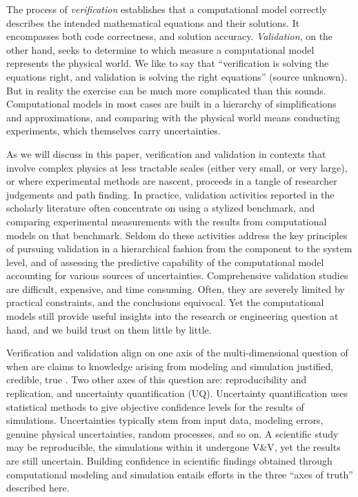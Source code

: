 The process of \emph{verification} establishes that a computational model correctly describes the intended mathematical equations and their solutions.
It encompasses both code correctness, and solution accuracy.
\emph{Validation}, on the other hand, seeks to determine to which measure a computational model represents the physical world. 
We like to say that ``verification is solving the equations right, and validation is solving the right equations'' (source unknown). 
But in reality the exercise can be much more complicated than this sounds. 
Computational models in most cases are built in a hierarchy of simplifications and approximations, and comparing with the physical world means conducting experiments, which themselves carry uncertainties. 

As we will discuss in this paper, verification and validation in contexts that involve complex physics at less tractable scales (either very small, or very large), or where experimental methods are nascent, proceeds in a tangle of researcher judgements and path finding. 
In practice, validation activities reported in the scholarly literature often concentrate on using a stylized benchmark, and comparing experimental measurements with the results from computational models on that benchmark. 
Seldom do these activities address the key principles of pursuing validation in a hierarchical fashion from the component to the system level, and of assessing the predictive capability of the computational model accounting for various sources of uncertainties. 
Comprehensive validation studies are difficult, expensive, and time consuming. 
Often, they are severely limited by practical constraints, and the conclusions equivocal. 
Yet the computational models still provide useful insights into the research or engineering question at hand, and we build trust on them little by little.

Verification and validation align on one axis of the multi-dimensional question of when are claims to knowledge arising from modeling and simulation justified, credible, true \cite{winsberg-2010}.
Two other axes of this question are: reproducibility and replication, and uncertainty quantification (UQ).
Uncertainty quantification uses statistical methods to give objective confidence levels for the results of simulations. 
Uncertainties typically stem from input data, modeling errors, genuine physical uncertainties, random processes, and so on. 
A scientific study may be reproducible, the simulations within it undergone V\&V, yet the results are still uncertain. 
Building confidence in scientific findings obtained through computational modeling and simulation entails efforts in the three ``axes of truth'' described here.

